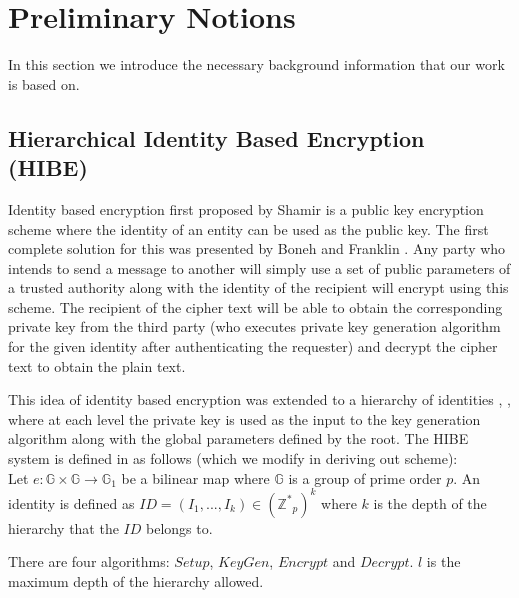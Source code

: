 \section{Preliminary Notions}

In this section we introduce the necessary background information that our work is based on.

\subsection{Hierarchical Identity Based Encryption (HIBE)}
Identity based encryption first proposed by Shamir\cite{Shamir:1985:ICS:19478.19483} is a public key encryption scheme where the identity of an entity can be used as the public key. The first complete solution for this was presented by Boneh and Franklin \cite{Boneh:2003:IEW:639069.639089}. Any party who intends to send a message to another will simply use a set of public parameters of a trusted authority along with the identity of the recipient will encrypt using this scheme. The recipient of the cipher text will be able to obtain the corresponding private key from the third party (who executes private key generation algorithm for the given identity after authenticating the requester) and decrypt the cipher text to obtain the plain text.

This idea of identity based encryption was extended to a hierarchy of identities \cite{Horwitz02towardhierarchical}, \cite{BBG05}, where at each level the private key is used as the input to the key generation algorithm along with the global parameters defined by the root. The HIBE system is defined in \cite{BBG05} as follows (which we modify in deriving out scheme):\\

Let $e : \mathbb{G} \times \mathbb{G} \to \mathbb{G}_1 $ be a bilinear map where $\mathbb{G}$ is a group of prime order $p$. An identity is defined as $ID = (I_1, ..., I_k) \in ({{\mathbb{Z}}^*}_p)^k$ where $k$ is the depth of the hierarchy that the $ID$ belongs to.

There are four algorithms: $Setup$, $KeyGen$, $Encrypt$ and $Decrypt$. $l$ is the maximum depth of the hierarchy allowed.\\

